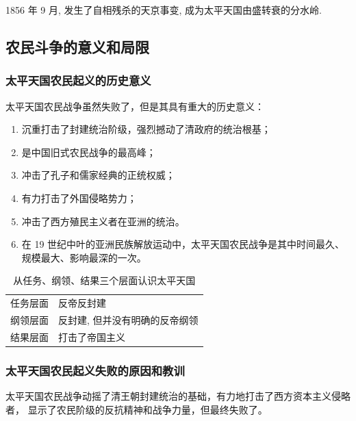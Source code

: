 \documentclass[10pt, UTF8]{book} %
\begin{document}
1856 年 9 月, 发生了自相残杀的天京事变, 成为太平天国由盛转衰的分水岭.

\subsection{农民斗争的意义和局限}

\subsubsection{太平天国农民起义的历史意义}

太平天国农民战争虽然失败了，但是其具有重大的历史意义：
\begin{enumerate}[label=(\arabic*), itemsep=0pt]
    \item 沉重打击了封建统治阶级，强烈撼动了清政府的统治根基；
    \item 是中国旧式农民战争的最高峰；
    \item 冲击了孔子和儒家经典的正统权威；
    \item 有力打击了外国侵略势力；
    \item 冲击了西方殖民主义者在亚洲的统治。
    \item 在 19 世纪中叶的亚洲民族解放运动中，太平天国农民战争是其中时间最久、
    规模最大、影响最深的一次。
\end{enumerate}

\begin{table}[H]
    \centering
    \caption{从任务、纲领、结果三个层面认识太平天国}
    \begin{tabular}{c|p{}}
        任务层面 & 反帝反封建 \\ 
        纲领层面 & 反封建, 但并没有明确的反帝纲领 \\ 
        结果层面 & 打击了帝国主义
    \end{tabular}
\end{table}

\subsubsection{太平天国农民起义失败的原因和教训}

太平天国农民战争动摇了清王朝封建统治的基础，有力地打击了西方资本主义侵略者，
显示了农民阶级的反抗精神和战争力量，但最终失败了。
\end{document}
